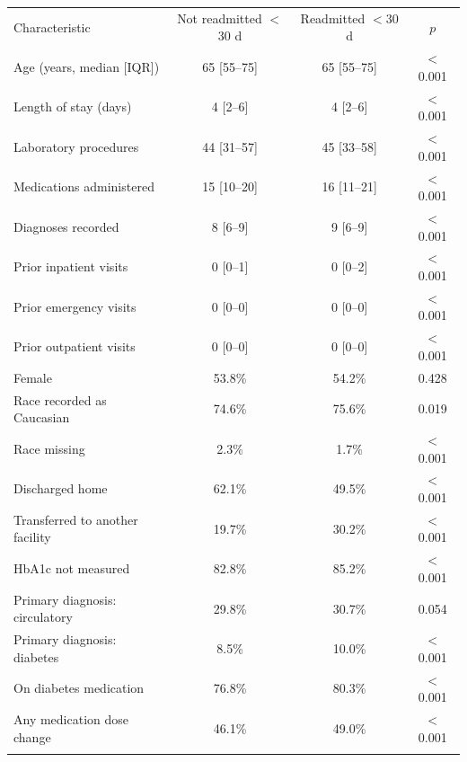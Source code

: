 \begin{tabular}{lccc}
\hline\noalign{\smallskip}
Characteristic & Not readmitted $<$30 d & Readmitted $<$30 d & $p$ \\
\noalign{\smallskip}\hline\noalign{\smallskip}
Age (years, median [IQR]) & 65 [55--75] & 65 [55--75] & $<$0.001 \\
Length of stay (days) & 4 [2--6] & 4 [2--6] & $<$0.001 \\
Laboratory procedures & 44 [31--57] & 45 [33--58] & $<$0.001 \\
Medications administered & 15 [10--20] & 16 [11--21] & $<$0.001 \\
Diagnoses recorded & 8 [6--9] & 9 [6--9] & $<$0.001 \\
Prior inpatient visits & 0 [0--1] & 0 [0--2] & $<$0.001 \\
Prior emergency visits & 0 [0--0] & 0 [0--0] & $<$0.001 \\
Prior outpatient visits & 0 [0--0] & 0 [0--0] & $<$0.001 \\
Female & 53.8\% & 54.2\% & 0.428 \\
Race recorded as Caucasian & 74.6\% & 75.6\% & 0.019 \\
Race missing & 2.3\% & 1.7\% & $<$0.001 \\
Discharged home & 62.1\% & 49.5\% & $<$0.001 \\
Transferred to another facility & 19.7\% & 30.2\% & $<$0.001 \\
HbA1c not measured & 82.8\% & 85.2\% & $<$0.001 \\
Primary diagnosis: circulatory & 29.8\% & 30.7\% & 0.054 \\
Primary diagnosis: diabetes & 8.5\% & 10.0\% & $<$0.001 \\
On diabetes medication & 76.8\% & 80.3\% & $<$0.001 \\
Any medication dose change & 46.1\% & 49.0\% & $<$0.001 \\
\noalign{\smallskip}\hline
\end{tabular}
